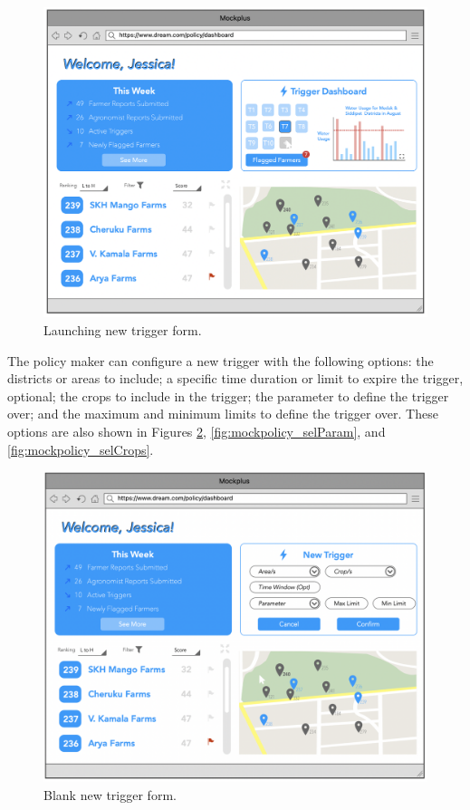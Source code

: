 \begin{figure}[H]
\centering
\includegraphics[scale=0.35]{../images_diagrams/mock_ups/dd/Trig01_NewTrig.png}
\caption{\label{fig:mockpolicy_newtrig}Launching new trigger form.}
\end{figure}

\noindent
The policy maker can configure a new trigger with the following options: the districts or areas to include; a specific time duration or limit to expire the trigger, optional; the crops to include in the trigger; the parameter to define the trigger over; and the maximum and minimum limits to define the trigger over. These options are also shown in Figures \ref{fig:mockpolicy_form}, \ref{fig:mockpolicy_selParam}, and \ref{fig:mockpolicy_selCrops}. 

\begin{figure}[H]
\centering
\includegraphics[scale=0.35]{../images_diagrams/mock_ups/dd/Trig02_SetUp.png}
\caption{\label{fig:mockpolicy_form}Blank new trigger form.}
\end{figure}

